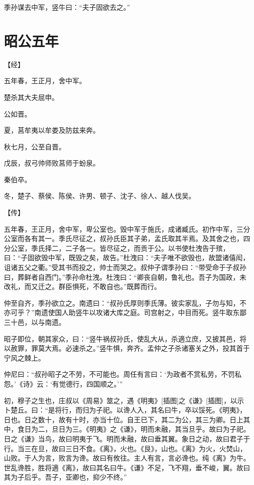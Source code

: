 \documentclass[a4paper,12pt,UTF8,twoside]{ctexbook}
\begin{document}
季孙谋去中军，竖牛曰：“夫子固欲去之。”


\chapter{昭公五年}



【经】

五年春，王正月，舍中军。

楚杀其大夫屈申。

公如晋。

夏，莒牟夷以牟娄及防兹来奔。

秋七月，公至自晋。

戊辰，叔弓帅师败莒师于蚡泉。

秦伯卒。

冬，楚子、蔡侯、陈侯、许男、顿子、沈子、徐人、越人伐吴。

【传】

五年春，王正月，舍中军，卑公室也。毁中军于施氏，成诸臧氏。初作中军，三分公室而各有其一。季氏尽征之，叔孙氏臣其子弟，孟氏取其半焉。及其舍之也，四分公室，季氏择二，二子各一。皆尽征之，而贡于公。以书使杜洩告于殡，曰：“子固欲毁中军，既毁之矣，故告。”杜洩曰：“夫子唯不欲毁也，故盟诸僖闳，诅诸五父之衢。”受其书而投之，帅士而哭之。叔仲子谓季孙曰：“带受命于子叔孙曰，葬鲜者自西门。”季孙命杜洩。杜洩曰：“卿丧自朝，鲁礼也。吾子为国政，未改礼，而又迁之。群臣惧死，不敢自也。”既葬而行。

仲至自齐，季孙欲立之。南遗曰：“叔孙氏厚则季氏薄。彼实家乱，子勿与知，不亦可乎？”南遗使国人助竖牛以攻诸大库之庭。司宫射之，中目而死。竖牛取东鄙三十邑，以与南遗。

昭子即位，朝其家众，曰：“竖牛祸叔孙氏，使乱大从，杀適立庶，又披其邑，将以赦罪，罪莫大焉。必速杀之。”竖牛惧，奔齐。孟仲之子杀诸塞关之外，投其首于宁风之棘上。

仲尼曰：“叔孙昭子之不劳，不可能也。周任有言曰：‘为政者不赏私劳，不罚私怨。’《诗》云：‘有觉德行，四国顺之。’”

初，穆子之生也，庄叔以《周易》筮之，遇《明夷》[插图]之《谦》[插图]，以示卜楚丘。曰：“是将行，而归为子祀。以谗人入，其名曰牛，卒以馁死。《明夷》，日也。日之数十，故有十时，亦当十位。自王已下，其二为公，其三为卿。日上其中，食日为二，旦日为三。《明夷》之《谦》，明而未融，其当旦乎。故曰为子祀。日之《谦》当鸟，故曰明夷于飞。明而未融，故曰垂其翼。象日之动，故曰君子于行。当三在旦，故曰三日不食。《离》，火也。《艮》，山也。《离》为火，火焚山，山败。于人为言，败言为谗。故曰有攸往。主人有言，言必谗也。纯《离》为牛。世乱谗胜，胜将適《离》，故曰其名曰牛。《谦》不足，飞不翔，垂不峻，翼。故曰其为子后乎。吾子，亚卿也，抑少不终。”
\end{document}
